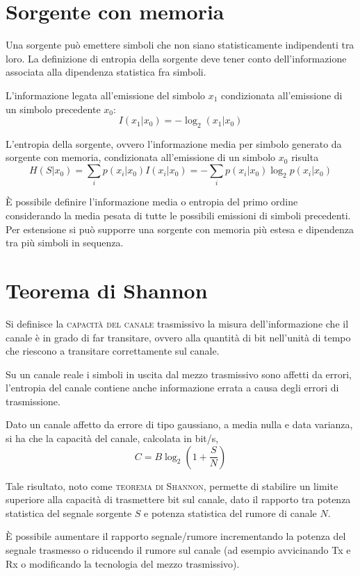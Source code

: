 \section{Sorgente con memoria}
Una sorgente può emettere simboli che non siano statisticamente indipendenti tra loro. La definizione di entropia della sorgente deve tener conto dell'informazione associata alla dipendenza statistica fra simboli.

L'informazione legata all'emissione del simbolo $x_1$ condizionata all'emissione di un simbolo precedente $x_0$:
\[I(x_1|x_0)=-\log_2(x_1|x_0)\]

L'entropia della sorgente, ovvero l'informazione media per simbolo generato da sorgente con memoria, condizionata all'emissione di un simbolo $x_0$ risulta
\[H(S|x_0)=\sum_i p(x_i|x_0) I(x_i|x_0) = -\sum_i p(x_i|x_0)\log_2 p(x_i|x_0)\]

\`{E} possibile definire l'informazione media o entropia del primo ordine considerando la media pesata di tutte le possibili emissioni di simboli precedenti. Per estensione si può supporre una sorgente con memoria più estesa e dipendenza tra più simboli in sequenza.

\section{Teorema di Shannon}
Si definisce la \textsc{capacità del canale} trasmissivo la misura dell'informazione che il canale è in grado di far transitare, ovvero alla quantità di bit nell'unità di tempo che riescono a transitare correttamente sul canale.

Su un canale reale i simboli in uscita dal mezzo trasmissivo sono affetti da errori, l'entropia del canale contiene anche informazione errata a causa degli errori di trasmissione.

Dato un canale affetto da errore di tipo gaussiano, a media nulla e data varianza, si ha che la capacità del canale, calcolata in bit/s,
\begin{equation}
C=B \log_2 \left(1+\frac{S}{N}\right)
\end{equation}

Tale risultato, noto come \textsc{teorema di Shannon}, permette di stabilire un limite superiore alla capacità di trasmettere bit sul canale, dato il rapporto tra potenza statistica del segnale sorgente $S$ e potenza statistica del rumore di canale $N$.

\begin{nota}
\`{E} possibile aumentare il rapporto segnale/rumore incrementando la potenza del segnale trasmesso o riducendo il rumore sul canale (ad esempio avvicinando Tx e Rx o modificando la tecnologia del mezzo trasmissivo).
\end{nota}

